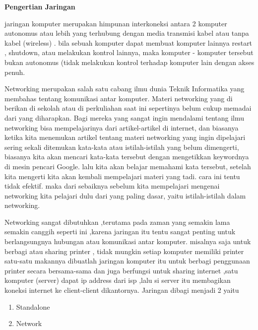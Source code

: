 \textbf{Pengertian Jaringan} \par
jaringan komputer merupakan himpunan interkoneksi antara 2 komputer autonomus atau lebih yang terhubung dengan media transmisi kabel atau tanpa kabel (wireless) . bila sebuah komputer dapat membuat komputer lainnya restart , shutdown, atau melakukan kontrol lainnya, maka komputer - komputer tersebut bukan autonomus (tidak melakukan kontrol terhadap komputer lain dengan akses penuh. \par
\vspace{12pt}
Networking merupakan salah satu cabang ilmu dunia Teknik Informatika yang membahas tentang komunikasi antar komputer. Materi networking yang di berikan di sekolah atau di perkuliahan saat ini sepertinya belum cukup memadai dari yang diharapkan. Bagi mereka yang sangat ingin mendalami tentang ilmu networking bisa mempelajarinya dari artikel-artikel di internet, dan biasanya ketika kita menemukan artikel tentang materi networking yang ingin dipelajari sering sekali ditemukan kata-kata atau istilah-istilah yang belum dimengerti, biasanya kita akan mencari kata-kata tersebut dengan mengetikkan keywordnya di mesin pencari Google. lalu kita akan belajar memahami kata tersebut, setelah kita mengerti kita akan kembali mempelajari materi yang tadi. cara ini tentu tidak efektif. maka dari sebaiknya sebelum kita mempelajari mengenai networking kita pelajari dulu dari yang paling dasar, yaitu istilah-istilah dalam networking. \par
\vspace{12pt}
Networking sangat dibutuhkan ,terutama pada zaman yang semakin lama semakin canggih seperti ini ,karena jaringan itu tentu sangat penting untuk berlangsungnya hubungan atau komunikasi antar komputer. misalnya saja untuk berbagi atau sharing printer , tidak mungkin setiap komputer memiliki printer satu-satu makannya dibuatlah jaringan komputer itu untuk berbagi penggunaan printer secara bersama-sama dan juga berfungsi untuk sharing internet ,satu komputer (server) dapat ip address dari isp ,lalu si server itu membagikan koneksi internet ke client-client dikantornya. Jaringan dibagi menjadi 2 yaitu \par
\noindent 
\begin{enumerate}
\item Standalone \par
\noindent 
\item Network\end{enumerate}
 \par
\vspace{12pt}
